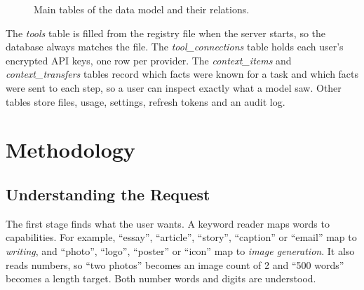 \documentclass[conference]{IEEEtran}
\begin{document}
\begin{figure}[!t]
\centering
{}
\caption{Main tables of the data model and their relations.}
\label{fig:er}
\end{figure}

The \textit{tools} table is filled from the registry file when the server starts, so the database always
matches the file. The \textit{tool\_connections} table holds each user's encrypted API keys, one row per
provider. The \textit{context\_items} and \textit{context\_transfers} tables record which facts were known
for a task and which facts were sent to each step, so a user can inspect exactly what a model saw. Other
tables store files, usage, settings, refresh tokens and an audit log.

\section{Methodology}

\subsection{Understanding the Request}
The first stage finds what the user wants. A keyword reader maps words to capabilities. For example,
``essay'', ``article'', ``story'', ``caption'' or ``email'' map to \textit{writing}, and ``photo'',
``logo'', ``poster'' or ``icon'' map to \textit{image generation}. It also reads numbers, so ``two
photos'' becomes an image count of 2 and ``500 words'' becomes a length target. Both number words and
digits are understood.
\end{document}
